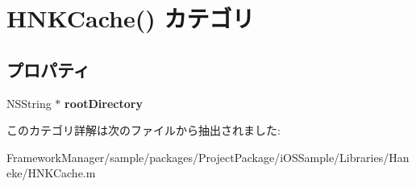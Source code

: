 \hypertarget{category_h_n_k_cache_07_08}{}\section{H\+N\+K\+Cache() カテゴリ}
\label{category_h_n_k_cache_07_08}
\subsection*{プロパティ}
\begin{DoxyCompactItemize}
\item 
\hypertarget{category_h_n_k_cache_07_08_adbd41f87bc1b4e9475e063072436c484}{}N\+S\+String $\ast$ {\bfseries root\+Directory}\label{category_h_n_k_cache_07_08_adbd41f87bc1b4e9475e063072436c484}

\end{DoxyCompactItemize}


このカテゴリ詳解は次のファイルから抽出されました\+:\begin{DoxyCompactItemize}
\item 
Framework\+Manager/sample/packages/\+Project\+Package/i\+O\+S\+Sample/\+Libraries/\+Haneke/H\+N\+K\+Cache.\+m\end{DoxyCompactItemize}
